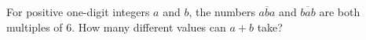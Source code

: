 For positive one-digit integers $a$ and $b$, the numbers $\overline{aba}$ and $\overline{bab}$ are both multiples of $6$. How many different values can $a+b$ take?
